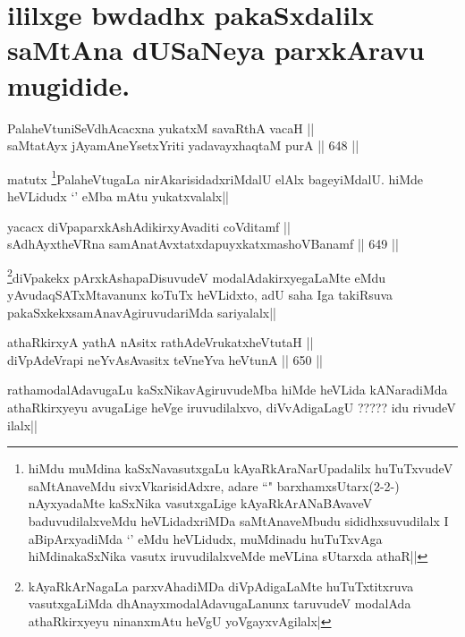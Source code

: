 \section*{ililxge bwdadhx pakaSxdalilx saMtAna dUSaNeya parxkAravu mugidide.}

\begin{shl}
PalaheVtuniSeVdhAcacxna yukatxM savaRthA vacaH || \\
saMtatAyx jAyamAneYsetxYriti yadavayxhaqtaM purA ||  648 ||  
\end{shl}

\begin{artha}
matutx \footnote{hiMdu muMdina kaSxNavasutxgaLu kAyaRkAraNarUpadalilx huTuTxvudeV saMtAnaveMdu sivxVkarisidAdxre, adare ``\stext" barxhamxsUtarx(2-2-) nAyxyadaMte kaSxNika vasutxgaLige kAyaRkArANaBAvaveV baduvudilalxveMdu heVLidadxriMDa saMtAnaveMbudu sididhxsuvudilalx I aBipArxyadiMda `\stext' eMdu heVLidudx, muMdinadu huTuTxvAga hiMdinakaSxNika vasutx iruvudilalxveMde meVLina sUtarxda athaR||}PalaheVtugaLa nirAkarisidadxriMdalU elAlx bageyiMdalU. hiMde heVLidudx `\stext' eMba mAtu yukatxvalalx||
\end{artha}

\begin{shl}
yacacx diVpaparxkAshAdikirxyAvaditi coVditamf || \\
sAdhAyxtheVRna samAnatAvxtatxdapuyxkatxmashoVBanamf ||  649 ||  
\end{shl}

\begin{artha}
\footnote{kAyaRkArNagaLa parxvAhadiMDa diVpAdigaLaMte huTuTxtitxruva vasutxgaLiMda dhAnayxmodalAdavugaLanunx taruvudeV modalAda athaRkirxyeyu ninanxmAtu heVgU  yoVgayxvAgilalx|}diVpakekx pArxkAshapaDisuvudeV modalAdakirxyegaLaMte eMdu yAvudaqSATxMtavanunx koTuTx heVLidxto, adU saha Iga takiRsuva pakaSxkekxsamAnavAgiruvudariMda sariyalalx||
\end{artha}


\begin{shl}
athaRkirxyA yathA nAsitx rathAdeVrukatxheVtutaH || \\
diVpAdeVrapi neYvAsAvasitx teVneYva heVtunA ||  650 ||  
\end{shl}

\begin{artha}
rathamodalAdavugaLu kaSxNikavAgiruvudeMba hiMde heVLida kANaradiMda athaRkirxyeyu avugaLige heVge iruvudilalxvo, diVvAdigaLagU ????? idu rivudeV ilalx||
\end{artha}

